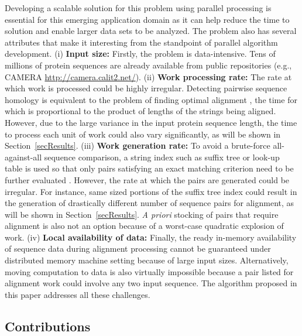 \documentclass[10pt,journal,letterpaper,compsoc]{IEEEtran}
\begin{document}
Developing a scalable solution for this problem using parallel processing is essential for this emerging application domain as it can help reduce the time to solution and enable larger data sets to be analyzed. The problem also has several attributes that make it interesting from the standpoint of parallel algorithm development. (i) {\bf Input size:} Firstly, the problem is data-intensive. Tens of millions of protein sequences are already available from public repositories (e.g., CAMERA \url{http://camera.calit2.net/}). (ii) {\bf Work processing rate:} The rate at which work is processed could be highly irregular. Detecting pairwise sequence homology is equivalent to the problem of finding optimal alignment \cite{Smith81}, the time for which is proportional to the product of lengths of the strings being aligned. However, due to the large variance in the input protein sequence length, the time to process each unit of work could also vary significantly, as will be shown in Section~\ref{secResults}.  (iii) {\bf Work generation rate:} To avoid a brute-force all-against-all sequence comparison, a string index such as suffix tree \cite{Weiner73} or look-up table \cite{Altschul90} is used so that only pairs satisfying an exact matching criterion need to be further evaluated \cite{Wu08, Yooseph07}. However, the rate at which the pairs are generated could be irregular. For instance, same sized portions of the suffix tree index could result in the generation of drastically different number of sequence pairs for alignment, as will be shown in Section~\ref{secResults}. {\it A priori} stocking of pairs that require alignment is also not an option because of a worst-case quadratic explosion of work. (iv) {\bf Local availability of data:}  Finally, the ready in-memory availability of sequence data during alignment processing cannot be guaranteed under distributed memory machine setting because of large input sizes. Alternatively, moving computation to data is also virtually impossible because a pair listed for alignment work could involve any two input sequence. The algorithm proposed in this paper addresses all these challenges.


\subsection{Contributions}
\label{secContributions}
\end{document}
